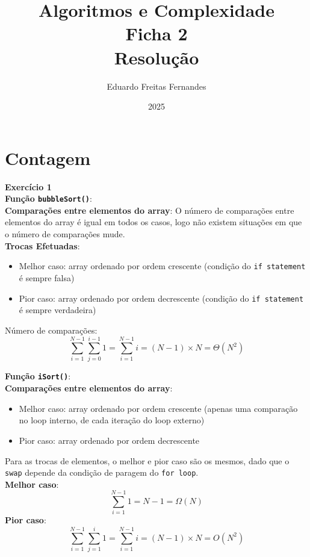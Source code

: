 \documentclass[a4paper,11pt]{article}
\title{Algoritmos e Complexidade\\ Ficha 2\\ Resolução}
\author{Eduardo Freitas Fernandes}
\date{2025}
\begin{document}
	
	\maketitle
	
	
	\section{Contagem}
	
	\textbf{Exercício 1}\\
	
	\noindent \textbf{Função \texttt{bubbleSort()}}:\\
	
	\noindent \textbf{Comparações entre elementos do array}:
	O número de comparações entre elementos do array é igual em todos os casos, logo não existem situações em que o número de comparações mude.\\
	
	\noindent \textbf{Trocas Efetuadas}:
	\begin{itemize}
		\item Melhor caso: array ordenado por ordem crescente (condição do \texttt{if statement} é sempre falsa)
		\item Pior caso: array ordenado por ordem decrescente (condição do \texttt{if statement} é sempre verdadeira)
	\end{itemize}
	
	\noindent Número de comparações:
	\[
	\sum_{i=1}^{N-1} \sum_{j=0}^{i-1} 1 = \sum_{i=1}^{N-1} i = (N-1) \times N = \Theta(N^2)
	\]
	
	\noindent \textbf{Função \texttt{iSort()}}:\\
	
	\noindent \textbf{Comparações entre elementos do array}:
	\begin{itemize}
		\item Melhor caso: array ordenado por ordem crescente (apenas uma comparação no loop interno, de cada iteração do loop externo)
		\item Pior caso: array ordenado por ordem decrescente
	\end{itemize}
	
	\noindent Para as trocas de elementos, o melhor e pior caso são os mesmos, dado que o \texttt{swap} depende da condição de paragem do \texttt{for loop}.\\
	
	\noindent \textbf{Melhor caso}:
	\[ \sum_{i=1}^{N-1} 1 = N-1 = \Omega(N) \]
	\textbf{Pior caso}:
	\[ \sum_{i=1}^{N-1} \sum_{j=1}^{i} 1 = \sum_{i=1}^{N-1} i = (N-1) \times N = O(N^2) \]
	
\end{document}
